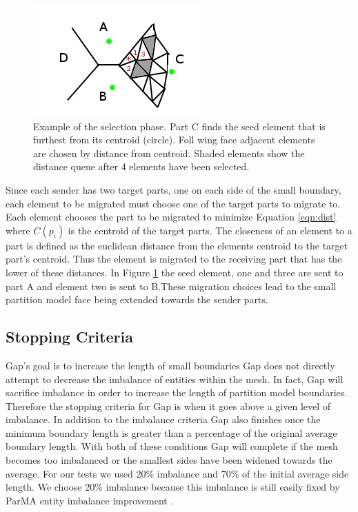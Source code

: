 \documentclass{thesis}
\begin{document}
\begin{figure} [!ht]
\centering
\captionsetup{justification=centering,margin=1cm}
\includegraphics[width=.6\textwidth]{selector_example.png}
\caption{\label{fig:selector} \textnormal{Example of the selection phase. Part C finds the seed element that is furthest from its centroid (circle). Foll wing face adjacent elements are chosen by distance from centroid. Shaded elements show the distance queue after 4 elements have been selected. }}
\end{figure}

Since each sender has two target parts, one on each side of the small 
boundary, each element to be migrated must choose one of the target parts to 
migrate to. Each element chooses the part to be migrated to minimize Equation \ref{eqn:dist} where $C(p_i)$ is the centroid of the target parts. 
The closeness of an element to a part is defined as the euclidean distance 
from the elements centroid to the target part's centroid. Thus the element 
is migrated to the receiving part that has the lower of these distances. 
In Figure \ref{fig:selector} the seed element, one and three are sent to 
part A and element two is sent to B.These migration choices lead to the 
small partition model face being extended towards the sender parts. 


\subsection{Stopping Criteria}
Gap's goal is to increase the length of small boundaries
Gap does not directly attempt to decrease the imbalance of entities within 
the mesh. In fact, Gap will sacrifice imbalance in order to increase the 
length of partition model boundaries. Therefore the stopping criteria for Gap 
is when it goes above a given level of imbalance. In addition to the imbalance 
criteria Gap also finishes once the minimum boundary length is greater than 
a percentage of the original average boundary length. With both of these 
conditions Gap will complete if the mesh becomes too imbalanced or the 
smallest sides have been widened towards the average. For our tests we 
used 20\% imbalance and 70\% of the initial average side length. We choose 
20\% imbalance because this imbalance is still easily fixed by ParMA entity 
imbalance improvement \cite{parma,zhougraph,zhou2012}.
\end{document}
